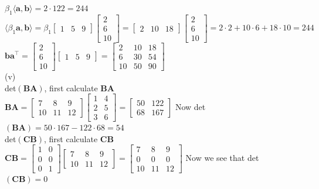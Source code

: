 \documentclass[11pt]{article}
\begin{document}
$\beta_1 \langle \mathbf{a,b} \rangle=2\cdot 122=244$\\
$\langle \beta_1 \mathbf{a,b} \rangle=\beta_1\begin{bmatrix}
    1&5&9
\end{bmatrix}\begin{bmatrix}
    2\\6\\10
\end{bmatrix}=\begin{bmatrix}
    2&10&18
\end{bmatrix}\begin{bmatrix}
    2\\6\\10
\end{bmatrix}=2\cdot2+10\cdot6+18\cdot 10=244$\\
$\mathbf{ba}^\top=\begin{bmatrix}
    2\\6\\10
\end{bmatrix}\begin{bmatrix}
    1&5&9
\end{bmatrix}=\begin{bmatrix}
    2&10&18\\
    6&30&54\\
    10&50&90
\end{bmatrix}$\\
(v)\\
det$(\mathbf{BA})$, first calculate $\mathbf{BA}$\\
$\mathbf{BA}=\begin{bmatrix}
    7&8&9\\
    10&11&12
\end{bmatrix}\begin{bmatrix}
    1&4\\
    2&5\\
    3&6
\end{bmatrix}=\begin{bmatrix}
    50&122\\
    68&167
\end{bmatrix}$ Now det$(\mathbf{BA})= 50\cdot 167-122\cdot 68=54$\\
det$(\mathbf{CB})$, first calculate $\mathbf{CB}$\\
$\mathbf{CB} = \begin{bmatrix}
    1&0\\0&0\\0&1
\end{bmatrix}\begin{bmatrix}
    7&8&9\\
    10&11&12
\end{bmatrix}=\begin{bmatrix}
    7&8&9\\
    0&0&0\\
    10&11&12
\end{bmatrix}$ Now we see that det$(\mathbf{CB})=0$\\
\end{document}

